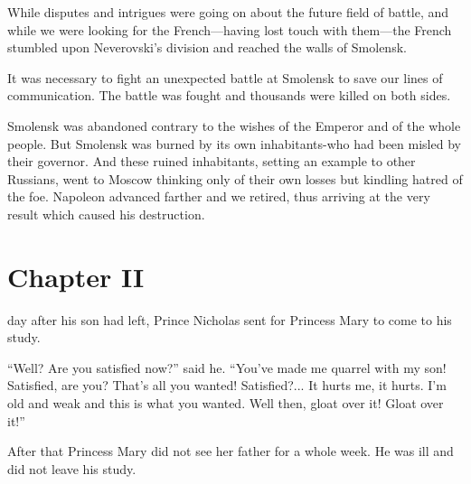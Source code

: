 While disputes and intrigues were going on about the future field
of battle, and while we were looking for the French---having lost
touch with them---the French stumbled upon Neverovski's division
and reached the walls of Smolensk.

It was necessary to fight an unexpected battle at Smolensk to
save our lines of communication. The battle was fought and
thousands were killed on both sides.

Smolensk was abandoned contrary to the wishes of the Emperor and
of the whole people. But Smolensk was burned by its own
inhabitants-who had been misled by their governor. And these
ruined inhabitants, setting an example to other Russians, went to
Moscow thinking only of their own losses but kindling hatred of
the foe. Napoleon advanced farther and we retired, thus arriving
at the very result which caused his destruction.


\chapter*{Chapter II} \ifaudio {}
\fi

 day after his son had left, Prince Nicholas sent for Princess
Mary to come to his study.

``Well? Are you satisfied now?'' said he. ``You've made me
quarrel with my son! Satisfied, are you? That's all you wanted!
Satisfied?... It hurts me, it hurts. I'm old and weak and this is
what you wanted. Well then, gloat over it! Gloat over it!''

After that Princess Mary did not see her father for a whole
week. He was ill and did not leave his study.

